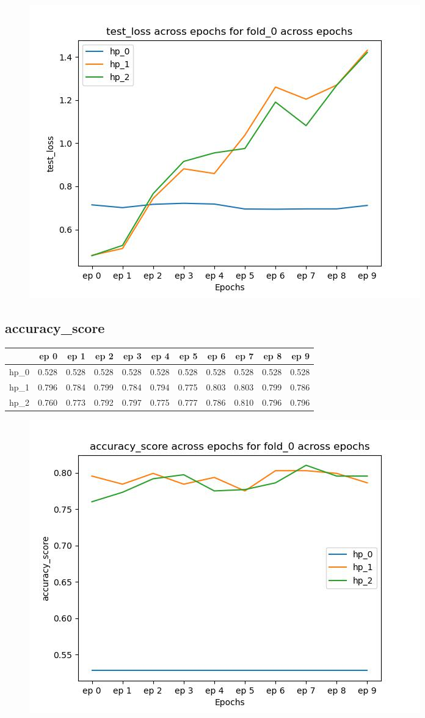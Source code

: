 \documentclass{article}
\begin{document}
\begin{figure}[H]
\includegraphics[scale = 0.75]{fold_0/test_loss}
\end{figure}
\subsection{accuracy\_score}
\begin{tabular}{lrrrrrrrrrr}
\toprule
{} &   ep 0 &   ep 1 &   ep 2 &   ep 3 &   ep 4 &   ep 5 &   ep 6 &   ep 7 &   ep 8 &   ep 9 \\
\midrule
hp\_0 &  0.528 &  0.528 &  0.528 &  0.528 &  0.528 &  0.528 &  0.528 &  0.528 &  0.528 &  0.528 \\
hp\_1 &  0.796 &  0.784 &  0.799 &  0.784 &  0.794 &  0.775 &  0.803 &  0.803 &  0.799 &  0.786 \\
hp\_2 &  0.760 &  0.773 &  0.792 &  0.797 &  0.775 &  0.777 &  0.786 &  0.810 &  0.796 &  0.796 \\
\bottomrule
\end{tabular}

\begin{figure}[H]
\includegraphics[scale = 0.75]{fold_0/accuracy_score}
\end{figure}
\end{document}
